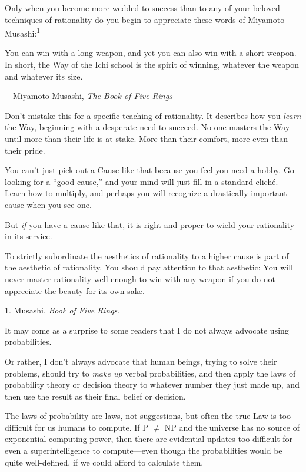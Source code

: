{
 Only when you become more wedded to success than to any of your
beloved techniques of rationality do you begin to appreciate these
words of Miyamoto Musashi:\textsuperscript{1}}

{
 You can win with a long weapon, and yet you can also win with a
short weapon. In short, the Way of the Ichi school is the spirit of
winning, whatever the weapon and whatever its size.}

{\raggedleft
 {}---Miyamoto Musashi, \textit{The Book of Five Rings}
\par}


\bigskip

{
 Don't mistake this for a specific teaching of
rationality. It describes how you \textit{learn} the Way, beginning
with a desperate need to succeed. No one masters the Way until more
than their life is at stake. More than their comfort, more even than
their pride.}

{
 You can't just pick out a Cause like that because
you feel you need a hobby. Go looking for a ``good
cause,'' and your mind will just fill in a standard
cliché. Learn how to multiply, and perhaps you will recognize a
drastically important cause when you see one.}

{
 But \textit{if} you have a cause like that, it is right and proper
to wield your rationality in its service.}

{
 To strictly subordinate the aesthetics of rationality to a higher
cause is part of the aesthetic of rationality. You should pay attention
to that aesthetic: You will never master rationality well enough to win
with any weapon if you do not appreciate the beauty for its own sake.}

\myendsectiontext


\bigskip

{
 1. Musashi, \textit{Book of Five Rings}.}


{
 It may come as a surprise to some readers that I do not always
advocate using probabilities. }

{
 Or rather, I don't always advocate that human
beings, trying to solve their problems, should try to \textit{make up}
verbal probabilities, and then apply the laws of probability theory or
decision theory to whatever number they just made up, and then use the
result as their final belief or decision.}

{
 The laws of probability are laws, not suggestions, but often the
true Law is too difficult for us humans to compute. If P ${\neq}$ NP
and the universe has no source of exponential computing power, then
there are evidential updates too difficult for even a superintelligence
to compute---even though the probabilities would be quite well-defined,
if we could afford to calculate them.}

